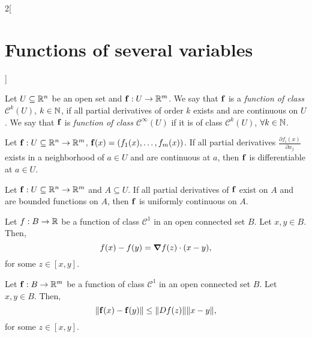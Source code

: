 \documentclass[../../../main.tex]{subfiles}
\begin{document}
\begin{multicols}{2}[\section{Functions of several variables}]
\begin{theorem}
    \end{theorem}
    \begin{definition}
        Let $U\subseteq\mathbb{R}^n$ be an open set and $\vb{f}:U\rightarrow\mathbb{R}^m$. We say that $\vb{f}$ is a \textit{function of class $\mathcal{C}^k(U)$}, $k\in\mathbb{N} $, if all partial derivatives of order $k$ exists and are continuous on $U$. We say that $\vb{f}$ is \textit{function of class $\mathcal{C}^\infty(U)$} if it is of class $\mathcal{C}^k(U)$, $\forall k\in\mathbb{N} $.
    \end{definition}
    \begin{theorem}
        Let $\vb{f}:U\subseteq\mathbb{R}^n\rightarrow\mathbb{R}^m$, $\vb{f}(x)=(f_1(x),\ldots,f_m(x))$. If all partial derivatives $\displaystyle \frac{\partial f_i(x)}{\partial x_j}$ exists in a neighborhood of $a\in U$ and are continuous at $a$, then $\vb{f}$ is differentiable at $a\in U$.
    \end{theorem}
    \begin{prop}
        Let $\vb{f}:U\subseteq\mathbb{R}^n\rightarrow\mathbb{R}^m$ and $A\subseteq U$. If all partial derivatives of $\vb{f}$ exist on $A$ and are bounded functions on $A$, then $\vb{f}$ is uniformly continuous on $A$.
    \end{prop}
    \begin{theorem}
        Let $f:B\rightarrow\mathbb{R} $ be a function of class $\mathcal{C}^1$ in an open connected set $B$. Let $x,y\in B$. Then, $$f(x)-f(y)=\grad f(z)\cdot(x-y),$$ for some $z\in[x,y]$.
    \end{theorem}
    \begin{theorem}
        Let $\vb{f}:B\rightarrow\mathbb{R}^m$ be a function of class $\mathcal{C}^1$ in an open connected set $B$. Let $x,y\in B$. Then, $$\|\vb{f}(x)-\vb{f}(y)\|\leq\|Df(z)\|\|x-y\|,$$ for some $z\in[x,y]$.
    \end{theorem}

\end{multicols}
\end{document}
